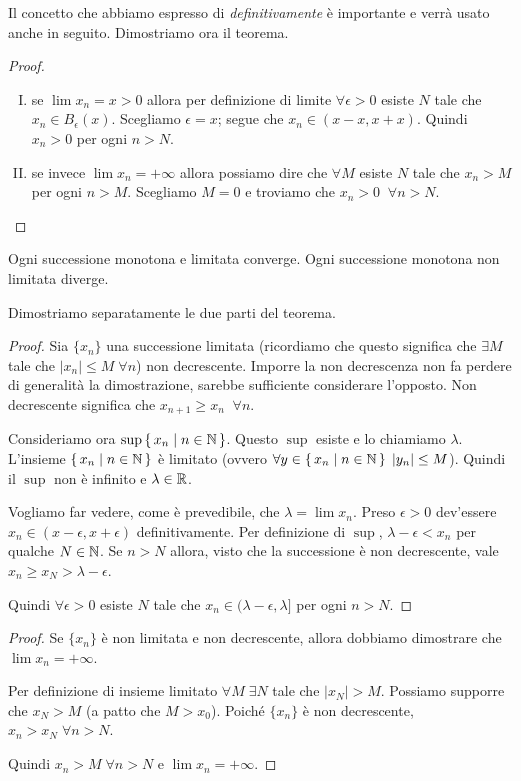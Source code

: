 Il concetto che abbiamo espresso di \emph{definitivamente} è importante e verrà usato anche in seguito. Dimostriamo ora il teorema.

\begin{proof} \hfill
\begin{enumerate}[I.]
\item se $\lim x_n = x > 0$ allora per definizione di limite $\forall \epsilon > 0$ esiste $N$ tale che $x_n \in B_{\epsilon}(x)$. Scegliamo $\epsilon = x$; segue che $x_n \in (x-x, x+x)$. Quindi $x_n > 0$ per ogni $n > N$.
\item se invece $\lim x_n = +\infty$ allora possiamo dire che $\forall M$ esiste $N$ tale che $x_n > M$ per ogni $n > M$. Scegliamo $M = 0$ e troviamo che $x_n > 0 \; \; \forall n > N$.
\end{enumerate}
\end{proof}

\begin{theorem}
Ogni successione monotona e limitata converge. Ogni successione monotona non limitata diverge. 
\end{theorem}

Dimostriamo separatamente le due parti del teorema.

\begin{proof}
Sia $\{x_n\}$ una successione limitata (ricordiamo che questo significa che $\exists M$ tale che $|x_n| \le M \; \forall n$) non decrescente. Imporre la non decrescenza non fa perdere di generalità la dimostrazione, sarebbe sufficiente considerare l'opposto. Non decrescente significa che $x_{n+1} \ge x_n \;\; \forall n$.

Consideriamo ora $\sup \set{x_n | n \in \mathbb N}$. Questo $\sup$ esiste e lo chiamiamo $\lambda$. L'insieme $\set{x_n | n \in \mathbb N}$ è limitato (ovvero $\forall y \in \set{x_n | n \in \mathbb N} \; |y_n| \le M$). Quindi il $\sup$ non è infinito e $\lambda \in \mathbb R$.

Vogliamo far vedere, come è prevedibile, che $\lambda = \lim x_n$. Preso $\epsilon > 0$ dev'essere $x_n \in (x-\epsilon, x+\epsilon)$ definitivamente. Per definizione di $\sup$, $\lambda - \epsilon < x_n$ per qualche $N \in \mathbb N$. Se $n > N$ allora, visto che la successione è non decrescente, vale $x_n \ge x_N > \lambda - \epsilon$.

Quindi $\forall \epsilon > 0$ esiste $N$ tale che $x_n \in (\lambda - \epsilon, \lambda]$ per ogni $n > N$.
\end{proof}

\begin{proof}
Se $\{x_n\}$ è non limitata e non decrescente, allora dobbiamo dimostrare che $\lim x_n = +\infty$.

Per definizione di insieme limitato $\forall M \; \exists N$ tale che $|x_N|>M$. Possiamo supporre che $x_N > M$ (a patto che $M > x_0$). Poiché $\{x_n\}$ è non decrescente, $x_n > x_N \; \forall n > N$.

Quindi $x_n > M \; \forall n > N$ e $\lim x_n = +\infty$.
\end{proof}

